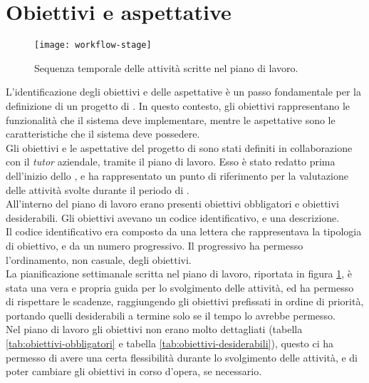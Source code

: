 \section{Obiettivi e aspettative}

\begin{figure}[!h] 
  \centering 
  \texttt{[image: workflow-stage]} 
  \caption{Sequenza temporale delle attività scritte nel piano di lavoro.}
  \label{fig:workflow-stage}
\end{figure}

L'identificazione degli obiettivi e delle aspettative è un passo fondamentale per la definizione di un progetto di \stage.
In questo contesto, gli obiettivi rappresentano le funzionalità che il sistema deve implementare, mentre le aspettative
sono le caratteristiche che il sistema deve possedere.\\
Gli obiettivi e le aspettative del progetto di \stage{} sono stati definiti in collaborazione con il \textit{tutor} aziendale, 
tramite il piano di lavoro.
Esso è stato redatto prima dell'inizio dello \stage, e ha rappresentato un punto di riferimento per la valutazione
delle attività svolte durante il periodo di \stage.\\
All'interno del piano di lavoro erano presenti obiettivi obbligatori e obiettivi desiderabili.
Gli obiettivi avevano un codice identificativo, e una descrizione.\\ 
Il codice identificativo era composto da una lettera che rappresentava la tipologia di obiettivo, e da un numero progressivo.
Il progressivo ha permesso l'ordinamento, non casuale, degli obiettivi. \\
La pianificazione settimanale scritta nel piano di lavoro, riportata in figura \ref*{fig:workflow-stage}, è stata una vera e propria 
guida per lo svolgimento delle attività, ed 
ha permesso di rispettare le scadenze, raggiungendo gli obiettivi prefissati in ordine di priorità, portando quelli desiderabili
a termine solo se il tempo lo avrebbe permesso.\\

Nel piano di lavoro gli obiettivi non erano molto dettagliati (tabella \ref*{tab:obiettivi-obbligatori} e tabella \ref*{tab:obiettivi-desiderabili}), questo ci ha permesso di avere una certa flessibilità durante lo svolgimento
delle attività, e di poter cambiare gli obiettivi in corso d'opera, se necessario.\\

